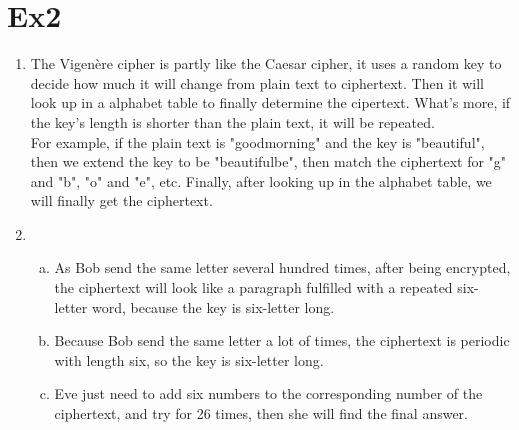 \documentclass[12pt, a4paper]{article}
\begin{document}
\newpage

\section{Ex2}
\begin{enumerate}
    \item The Vigenère cipher is partly like the Caesar cipher, it uses a random key to decide how much it will change from plain text
          to ciphertext. Then it will look up in a alphabet table to finally determine the cipertext. What's more, if the key's length
          is shorter than the plain text, it will be repeated.\\
          For example, if the plain text is "goodmorning" and the key is "beautiful", then we extend the key to be "beautifulbe",
          then match the ciphertext for "g" and "b", "o" and "e", etc. Finally, after looking up in the alphabet table, we will finally
          get the ciphertext.
    \item \begin{enumerate}[a)]
            \item As Bob send the same letter several hundred times, after being encrypted, the ciphertext will look like a paragraph
                  fulfilled with a repeated six-letter word, because the key is six-letter long.
            \item Because Bob send the same letter a lot of times, the ciphertext is periodic with length six, so the key is
                  six-letter long.
            \item Eve just need to add six numbers to the corresponding number of the ciphertext, and try for 26 times, then she will
                  find the final answer.
          \end{enumerate}
\end{enumerate}

\newpage
\end{document}
